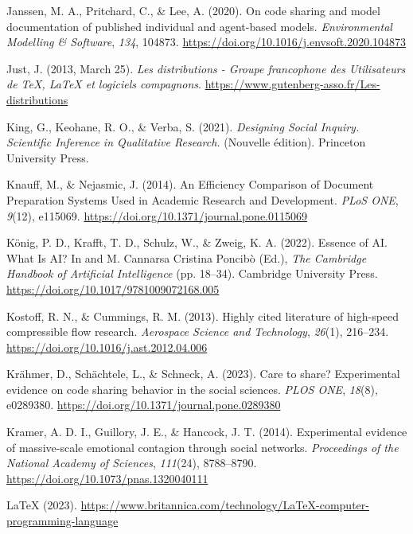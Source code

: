 \documentclass[
  letterpaper,
  DIV=11,
  numbers=noendperiod]{scrreprt}
\newlength{\cslhangindent}
\newenvironment{CSLReferences}[2] %
 {\begin{list}{}{%
  \setlength{\itemindent}{0pt}
  \setlength{\leftmargin}{0pt}
  \setlength{\parsep}{0pt}
  \ifodd #1
   \setlength{\leftmargin}{\cslhangindent}
   \setlength{\itemindent}{-1\cslhangindent}
  \fi
  \setlength{\itemsep}{#2\baselineskip}}}
 {\end{list}}
\begin{document}
\begin{CSLReferences}{1}{0}
Janssen, M. A., Pritchard, C., \& Lee, A. (2020). On code sharing and
model documentation of published individual and agent-based models.
\emph{Environmental Modelling \& Software}, \emph{134}, 104873.
\url{https://doi.org/10.1016/j.envsoft.2020.104873}

Just, J. (2013, March 25). \emph{Les distributions - {Groupe}
francophone des {Utilisateurs} de {TeX}, {LaTeX} et logiciels
compagnons}. \url{https://www.gutenberg-asso.fr/Les-distributions}

King, G., Keohane, R. O., \& Verba, S. (2021). \emph{Designing {Social
Inquiry}. {Scientific Inference} in {Qualitative Research}.} (Nouvelle
édition). Princeton University Press.

Knauff, M., \& Nejasmic, J. (2014). An {Efficiency Comparison} of
{Document Preparation Systems Used} in {Academic Research} and
{Development}. \emph{PLoS ONE}, \emph{9}(12), e115069.
\url{https://doi.org/10.1371/journal.pone.0115069}

König, P. D., Krafft, T. D., Schulz, W., \& Zweig, K. A. (2022). Essence
of {AI}. {What Is AI}? In and M. Cannarsa Cristina Poncibò (Ed.),
\emph{The {Cambridge Handbook} of {Artificial Intelligence}} (pp.
18--34). Cambridge University Press.
\url{https://doi.org/10.1017/9781009072168.005}

Kostoff, R. N., \& Cummings, R. M. (2013). Highly cited literature of
high-speed compressible flow research. \emph{Aerospace Science and
Technology}, \emph{26}(1), 216--234.
\url{https://doi.org/10.1016/j.ast.2012.04.006}

Krähmer, D., Schächtele, L., \& Schneck, A. (2023). Care to share?
{Experimental} evidence on code sharing behavior in the social sciences.
\emph{PLOS ONE}, \emph{18}(8), e0289380.
\url{https://doi.org/10.1371/journal.pone.0289380}

Kramer, A. D. I., Guillory, J. E., \& Hancock, J. T. (2014).
Experimental evidence of massive-scale emotional contagion through
social networks. \emph{Proceedings of the National Academy of Sciences},
\emph{111}(24), 8788--8790.
\url{https://doi.org/10.1073/pnas.1320040111}

{LaTeX} (2023).
\url{https://www.britannica.com/technology/LaTeX-computer-programming-language}


\end{CSLReferences}
\end{document}
